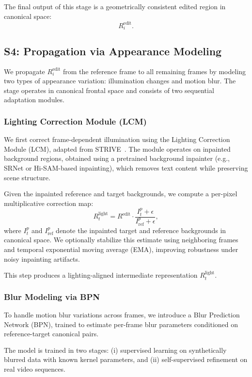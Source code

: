 The final output of this stage is a geometrically consistent edited region in canonical space:
\[
R_i^{\text{edit}}.
\]

\subsection{S4: Propagation via Appearance Modeling}

We propagate $R^{\text{edit}}_i$ from the reference frame to all remaining frames by modeling two types of appearance variation: illumination changes and motion blur. The stage operates in canonical frontal space and consists of two sequential adaptation modules.

\subsubsection{Lighting Correction Module (LCM)}

We first correct frame-dependent illumination using the Lighting Correction Module (LCM), adapted from STRIVE~\cite{strive}. The module operates on inpainted background regions, obtained using a pretrained background inpainter (e.g., SRNet or Hi-SAM-based inpainting), which removes text content while preserving scene structure.

Given the inpainted reference and target backgrounds, we compute a per-pixel multiplicative correction map:
\[
R^{\text{light}}_t = R^{\text{edit}} \cdot \frac{I_t^p + \epsilon}{I_{\text{ref}}^p + \epsilon},
\]
where $I_t^p$ and $I_{\text{ref}}^p$ denote the inpainted target and reference backgrounds in canonical space. We optionally stabilize this estimate using neighboring frames and temporal exponential moving average (EMA), improving robustness under noisy inpainting artifacts.

This step produces a lighting-aligned intermediate representation $R^{\text{light}}_t$.

\subsubsection{Blur Modeling via BPN}

To handle motion blur variations across frames, we introduce a Blur Prediction Network (BPN), trained to estimate per-frame blur parameters conditioned on reference-target canonical pairs.

The model is trained in two stages: (i) supervised learning on synthetically blurred data with known kernel parameters, and (ii) self-supervised refinement on real video sequences.

